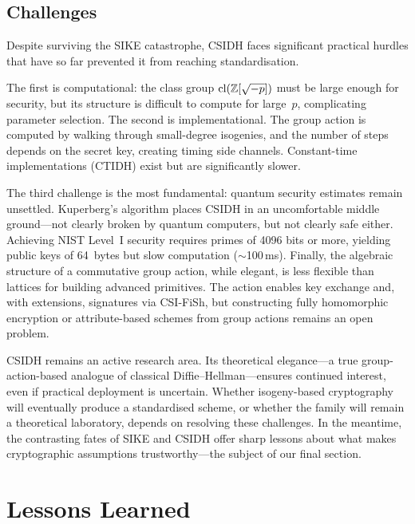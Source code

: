\subsection{Challenges}
\label{subsec:csidh-challenges}

Despite surviving the SIKE catastrophe, CSIDH faces significant practical hurdles that have so far prevented it from reaching standardisation.

The first is computational: the class group $\mathrm{cl}(\mathbb{Z}[\sqrt{-p}])$ must be large enough for security, but its structure is difficult to compute for large~$p$, complicating parameter selection.  The second is implementational.  The group action is computed by walking through small-degree isogenies, and the number of steps depends on the secret key, creating timing side channels.  Constant-time implementations (CTIDH) exist but are significantly slower.

The third challenge is the most fundamental: quantum security estimates remain unsettled.  Kuperberg's algorithm places CSIDH in an uncomfortable middle ground---not clearly broken by quantum computers, but not clearly safe either.  Achieving NIST Level~I security requires primes of 4096 bits or more, yielding public keys of 64~bytes but slow computation ($\sim$100\,ms).  Finally, the algebraic structure of a commutative group action, while elegant, is less flexible than lattices for building advanced primitives.  The action enables key exchange and, with extensions, signatures via CSI-FiSh, but constructing fully homomorphic encryption or attribute-based schemes from group actions remains an open problem.

CSIDH remains an active research area.  Its theoretical elegance---a true group-action-based analogue of classical Diffie--Hellman---ensures continued interest, even if practical deployment is uncertain.  Whether isogeny-based cryptography will eventually produce a standardised scheme, or whether the family will remain a theoretical laboratory, depends on resolving these challenges.  In the meantime, the contrasting fates of SIKE and CSIDH offer sharp lessons about what makes cryptographic assumptions trustworthy---the subject of our final section.


\section{Lessons Learned}
\label{sec:lessons}

